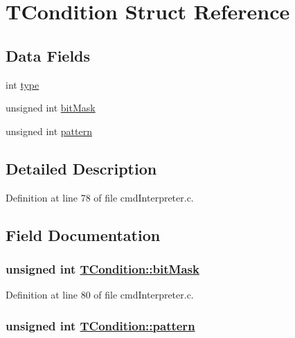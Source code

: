 \hypertarget{structTCondition}{
\section{TCondition Struct Reference}
\label{structTCondition}
}
\subsection*{Data Fields}
\begin{CompactItemize}
\item 
int \hyperlink{structTCondition_a0f092121f681df301d31ca256804d7b}{type}
\item 
unsigned int \hyperlink{structTCondition_7f5e8b0c24ff4ce266435ea2e75ad741}{bit\-Mask}
\item 
unsigned int \hyperlink{structTCondition_d70dd6afa7726f401616e1dfa5132fc6}{pattern}
\end{CompactItemize}


\subsection{Detailed Description}




Definition at line 78 of file cmd\-Interpreter.c.

\subsection{Field Documentation}
\hypertarget{structTCondition_7f5e8b0c24ff4ce266435ea2e75ad741}{
\subsubsection[bitMask]{\setlength{\rightskip}{0pt plus 5cm}unsigned int \hyperlink{structTCondition_7f5e8b0c24ff4ce266435ea2e75ad741}{TCondition::bit\-Mask}}}
\label{structTCondition_7f5e8b0c24ff4ce266435ea2e75ad741}




Definition at line 80 of file cmd\-Interpreter.c.\hypertarget{structTCondition_d70dd6afa7726f401616e1dfa5132fc6}{
\subsubsection[pattern]{\setlength{\rightskip}{0pt plus 5cm}unsigned int \hyperlink{structTCondition_d70dd6afa7726f401616e1dfa5132fc6}{TCondition::pattern}}}
\label{structTCondition_d70dd6afa7726f401616e1dfa5132fc6}




